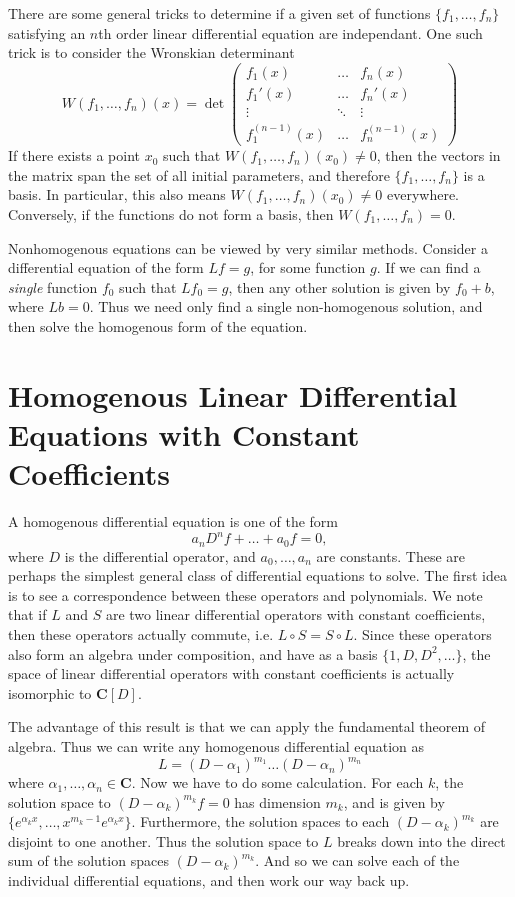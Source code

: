 There are some general tricks to determine if a given set of functions $\{ f_1, \dots, f_n \}$ satisfying an $n$th order linear differential equation are independant. One such trick is to consider the Wronskian determinant
%
\[ W(f_1, \dots, f_n)(x) = \det \begin{pmatrix} f_1(x) & \dots & f_n(x) \\ f_1'(x) & \dots & f_n'(x) \\ \vdots & \ddots & \vdots \\ f_1^{(n-1)}(x) & \dots & f_n^{(n-1)}(x) \end{pmatrix} \]
%
If there exists a point $x_0$ such that $W(f_1, \dots, f_n)(x_0) \neq 0$, then the vectors in the matrix span the set of all initial parameters, and therefore $\{ f_1, \dots, f_n \}$ is a basis. In particular, this also means $W(f_1, \dots, f_n)(x_0) \neq 0$ everywhere. Conversely, if the functions do not form a basis, then $W(f_1, \dots, f_n) = 0$.

Nonhomogenous equations can be viewed by very similar methods. Consider a differential equation of the form $Lf = g$, for some function $g$. If we can find a \emph{single} function $f_0$ such that $Lf_0 = g$, then any other solution is given by $f_0 + b$, where $Lb = 0$. Thus we need only find a single non-homogenous solution, and then solve the homogenous form of the equation.

\section{Homogenous Linear Differential Equations with Constant Coefficients}

A homogenous differential equation is one of the form
%
\[ a_n D^nf + \dots + a_0 f = 0, \]
%
where $D$ is the differential operator, and $a_0, \dots, a_n$ are constants. These are perhaps the simplest general class of differential equations to solve. The first idea is to see a correspondence between these operators and polynomials. We note that if $L$ and $S$ are two linear differential operators with constant coefficients, then these operators actually commute, i.e. $L \circ S = S \circ L$. Since these operators also form an algebra under composition, and have as a basis $\{ 1, D, D^2, \dots \}$, the space of linear differential operators with constant coefficients is actually isomorphic to $\mathbf{C}[D]$.

The advantage of this result is that we can apply the fundamental theorem of algebra. Thus we can write any homogenous differential equation as
%
\[ L = (D - \alpha_1)^{m_1} \dots (D - \alpha_n)^{m_n} \]
%
where $\alpha_1, \dots, \alpha_n \in \mathbf{C}$. Now we have to do some calculation. For each $k$, the solution space to $(D - \alpha_k)^{m_k} f = 0$ has dimension $m_k$, and is given by $\{ e^{\alpha_k x}, \dots, x^{m_k - 1} e^{\alpha_k x} \}$. Furthermore, the solution spaces to each $(D - \alpha_k)^{m_k}$ are disjoint to one another. Thus the solution space to $L$ breaks down into the direct sum of the solution spaces $(D - \alpha_k)^{m_k}$. And so we can solve each of the individual differential equations, and then work our way back up.

